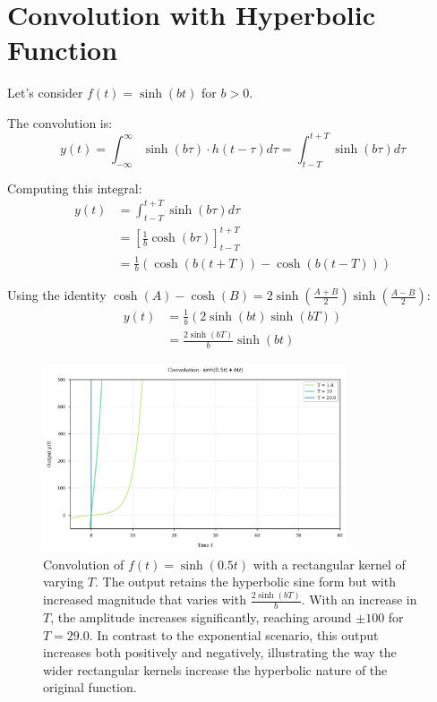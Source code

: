 	\section{Convolution with Hyperbolic Function}
	Let's consider $f(t) = \sinh(bt)$ for $b > 0$.
	
	The convolution is:
	\begin{equation}
		y(t) = \int_{-\infty}^{\infty} \sinh(b\tau) \cdot h(t - \tau) d\tau = \int_{t-T}^{t+T} \sinh(b\tau) d\tau
	\end{equation}
	
	Computing this integral:
	\begin{align}
		y(t) &= \int_{t-T}^{t+T} \sinh(b\tau) d\tau \\
		&= \left[ \frac{1}{b}\cosh(b\tau) \right]_{t-T}^{t+T} \\
		&= \frac{1}{b}(\cosh(b(t+T)) - \cosh(b(t-T)))
	\end{align}
	
	Using the identity $\cosh(A) - \cosh(B) = 2\sinh(\frac{A+B}{2})\sinh(\frac{A-B}{2})$:
	\begin{align}
		y(t) &= \frac{1}{b}(2\sinh(bt)\sinh(bT)) \\
		&= \frac{2\sinh(bT)}{b}\sinh(bt)
	\end{align}
	
	\begin{figure}[htbp]
		\centering
		\includegraphics[width=0.8\textwidth]{figs/hyper_convolution.png}
		\caption{Convolution of $f(t) = \sinh(0.5t)$ with a rectangular kernel of varying $T$. The output retains the hyperbolic sine form but with increased magnitude that varies with $\frac{2\sinh(bT)}{b}$. With an increase in $T$, the amplitude increases significantly, reaching around $\pm100$ for $T = 29.0$. In contrast to the exponential scenario, this output increases both positively and negatively, illustrating the way the wider rectangular kernels increase the hyperbolic nature of the original function.}
		\label{fig:hyper_convolution}
	\end{figure}
	
